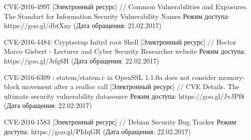 \begin{thebibliography}{00}
    CVE-2016-4997
    [Электронный ресурс] //
    Common Vulnerabilities and Exposures. The Standart for Information Security Vulnerability Names
    Режим доступа: https://goo.gl/dbtXny
    (Дата обращения: 21.02.2017)

    CVE-2016-4484: Cryptsetup Initrd root Shell
    [Электронный ресурс] //
    Hector Marco Gisbert - Lecturer and Cyber Security Researcher website
    Режим доступа: https://goo.gl/Jrfg6H
    (Дата обращения: 22.02.2017)

    CVE-2016-6309 : statem/statem.c in OpenSSL 1.1.0a does not consider memory-block movement after a realloc call
    [Электронный ресурс] //
    CVE Details. The ultimate security vulnerability datasource
    Режим доступа: https://goo.gl/JvJPf8
    (Дата обращения: 22.02.2017)

    CVE-2016-1583
    [Электронный ресурс] //
    Debian Security Bug Tracker
    Режим доступа: https://goo.gl/PIdqGR
    (Дата обращения: 22.02.2017)

\end{thebibliography}
\endgroup

\clearpage
